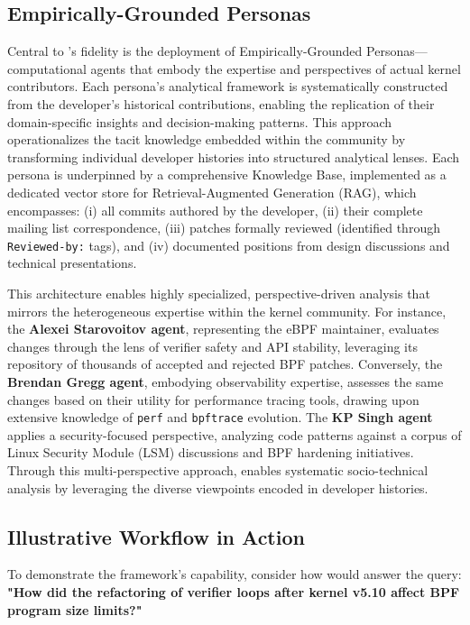 \subsection{Empirically-Grounded Personas}

Central to \sys's fidelity is the deployment of Empirically-Grounded Personas—computational agents that embody the expertise and perspectives of actual kernel contributors. Each persona's analytical framework is systematically constructed from the developer's historical contributions, enabling the replication of their domain-specific insights and decision-making patterns. This approach operationalizes the tacit knowledge embedded within the community by transforming individual developer histories into structured analytical lenses. Each persona is underpinned by a comprehensive Knowledge Base, implemented as a dedicated vector store for Retrieval-Augmented Generation (RAG), which encompasses: (i) all commits authored by the developer, (ii) their complete mailing list correspondence, (iii) patches formally reviewed (identified through \texttt{Reviewed-by:} tags), and (iv) documented positions from design discussions and technical presentations.

This architecture enables highly specialized, perspective-driven analysis that mirrors the heterogeneous expertise within the kernel community. For instance, the \textbf{Alexei Starovoitov agent}, representing the eBPF maintainer, evaluates changes through the lens of verifier safety and API stability, leveraging its repository of thousands of accepted and rejected BPF patches. Conversely, the \textbf{Brendan Gregg agent}, embodying observability expertise, assesses the same changes based on their utility for performance tracing tools, drawing upon extensive knowledge of \texttt{perf} and \texttt{bpftrace} evolution. The \textbf{KP Singh agent} applies a security-focused perspective, analyzing code patterns against a corpus of Linux Security Module (LSM) discussions and BPF hardening initiatives. Through this multi-perspective approach, \sys enables systematic socio-technical analysis by leveraging the diverse viewpoints encoded in developer histories.


\subsection{Illustrative Workflow in Action}

To demonstrate the framework's capability, consider how \sys would answer the query: \textbf{"How did the refactoring of verifier loops after kernel v5.10 affect BPF program size limits?"}

